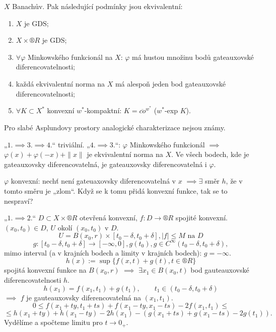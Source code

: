 \documentclass[12pt]{article}					%
\begin{document}
\begin{veta}
	$X$ Banachův. Pak následující podmínky jsou ekvivalentní:
	\begin{enumerate}
		\item $X$ je GDS;
		\item $X \times ®R$ je GDS;
		\item $\forall φ$ Minkowského funkcionál na $X$: $φ$ má hustou množinu bodů gateauxovské diferencovatelnosti;
		\item každá ekvivalentní norma na $X$ má alespoň jeden bod gateauxovské diferencovatelnosti;
		\item $\forall K \subset X^*$ konvexní $w^*$-kompaktní: $K = \overline{co}^{w^*}$ ($w^*$-exp $K$).
	\end{enumerate}

	\begin{poznamkain}
		Pro slabé Asplundovy prostory analogické charakterizace nejsou známy.
	\end{poznamkain}

	\begin{dukazin}
		„$1. \implies 3. \implies 4.$“ triviální. „$4. \implies 3.$“: $φ$ Minkowského funkcionál $\implies$ $φ(x) + φ(-x) + \|x\|$ je ekvivalentní norma na $X$. Ve všech bodech, kde je gateauxovsky diferencovatelná, je gateauxovsky diferencovatelná i $φ$.

		$φ$ konvexní: nechť není gateuaxovsky diferencovatelná v $x$ $\implies \exists$ směr $h$, že v tomto směru je „zlom“. Když se k tomu přidá konvexní funkce, tak se to nespraví?

		„$1. \implies 2.$“ $D \subset X \times ®R$ otevřená konvexní, $f: D \rightarrow ®R$ spojité konvexní. $(x_0, t_0) \in D$, $U$ okolí $(x_0, t_0)$ v $D$.
		$$ U = B(x_0, r) \times [t_0 - δ, t_0 + δ], |f| ≤ M \text{ na } D $$
		$$ g: [t_0 - δ, t_0 + δ] \rightarrow [-∞, 0], g(t_0), g \in C^∞(t_0 - δ, t_0 + δ), $$
		mimo interval (a v krajních bodech a limity v krajních bodech): $g = -∞$.
		$$ h(x) := \sup\{f(x, t) + g(t), t \in ®R\} $$
		spojitá konvexní funkce na $B(x_0, r)$ $\implies$ $\exists x_1 \in B(x_0, t)$ bod gauteauxovské diferencovatelnosti $h$.
		$$ h(x_1) = f(x_1, t_1) + g(t_1), \qquad t_1 \in (t_0 - δ, t_0 + δ) $$
		$\implies$ $f$ je gauteauxovsky diferencovatelná na $(x_1, t_1)$.
		$$ 0 ≤ f(x_1 + t y, t_1 + t s) + f(x_1 - t y, x_1 - t s) - 2f(x_1, t_1) ≤ $$
		$$ ≤ h(x_1 + t y) + h(x_1 - t y) - 2h(x_1) - (g(x_1 + t s) + g(x_1 - t s) - 2g(t_1)). $$
		Vydělíme a spočteme limitu pro $t \rightarrow 0_+$.
	\end{dukazin}
\end{veta}
\end{document}
